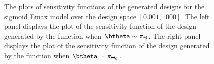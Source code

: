 \begin{figure}[t!]
\centering
{}
\caption{
  The   plots of sensitivity functions  of  the generated designs  for the sigmoid Emax model  over the design space $ [0.001, 1000]$.
  The left panel displays the plot of the sensitivity function of the design generated  by the  function    when $\btheta \sim \pi_{\Theta}$.
  The right panel displays the plot of the  sensitivity function of the design generated  by the function   when $\btheta \sim \pi_{\Theta_0}$.   
}
\label{fig:sensitivity-sigmoid-bayes}
\end{figure}

